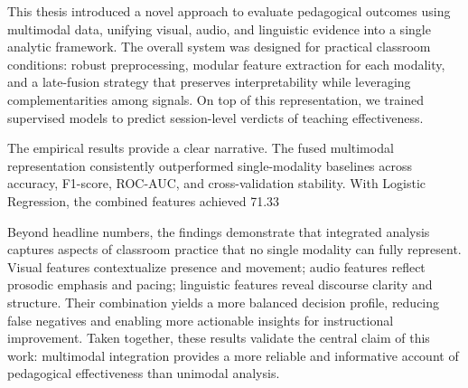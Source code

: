 This thesis introduced a novel approach to evaluate pedagogical outcomes using multimodal data, unifying visual, audio, and linguistic evidence into a single analytic framework. The overall system was designed for practical classroom conditions: robust preprocessing, modular feature extraction for each modality, and a late-fusion strategy that preserves interpretability while leveraging complementarities among signals. On top of this representation, we trained supervised models to predict session-level verdicts of teaching effectiveness.

The empirical results provide a clear narrative. The fused multimodal representation consistently outperformed single-modality baselines across accuracy, F1-score, ROC-AUC, and cross-validation stability. With Logistic Regression, the combined features achieved 71.33%

Beyond headline numbers, the findings demonstrate that integrated analysis captures aspects of classroom practice that no single modality can fully represent. Visual features contextualize presence and movement; audio features reflect prosodic emphasis and pacing; linguistic features reveal discourse clarity and structure. Their combination yields a more balanced decision profile, reducing false negatives and enabling more actionable insights for instructional improvement. Taken together, these results validate the central claim of this work: multimodal integration provides a more reliable and informative account of pedagogical effectiveness than unimodal analysis.

\newpage
